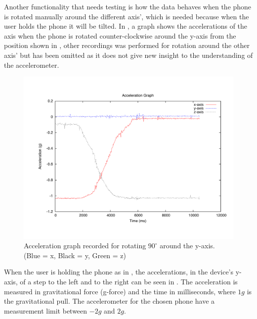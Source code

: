 Another functionality that needs testing is how the data behaves when the phone is rotated manually around the different axis', which is needed because when the user holds the phone it will be tilted.
In , a graph shows the accelerations of the axis when the phone is rotated counter-clockwise around the y-axis from the position shown in , other recordings was performed for rotation around the other axis' but has been omitted as it does not give new insight to the understanding of the accelerometer.
\begin{figure}[h]
\centering
	\includegraphics[scale=0.45, trim=0cm 2cm 0cm 2cm]{media/gnuplot/rotation.pdf}
	\caption{Acceleration graph recorded for rotating $90^\circ$ around the y-axis. (Blue = x, Black = y, Green = z)}
	\label{figure:phone-rotate-y-axis-graph}
\end{figure}
When the user is holding the phone as in , the accelerations, in the device's y-axis, of a step to the left and to the right can be seen in .
The acceleration is measured in gravitational force (g-force) and the time in milliseconds, where $1 g$ is the gravitational pull.
The accelerometer for the chosen phone have a measurement limit between $-2 g$ and $2 g$.

